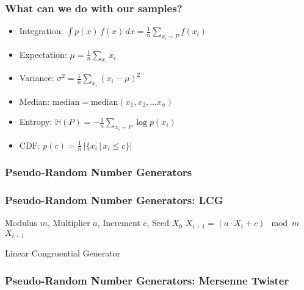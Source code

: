 \documentclass{beamer}
\begin{document}


\begin{frame}
\frametitle{What can we do with our samples?}
\begin{itemize}
  \item Integration: $\int p(x) \, f(x) \, dx = \frac{1}{n} \sum_{x_i \sim P} f(x_i) $
  \item Expectation: $ \mu = \frac{1}{n} \sum_{x_i} x_i $
  \item Variance: $ \sigma^2 = \frac{1}{n} \sum_{x_i} \left( x_i - \mu \right)^2$
  \item Median: $\text{median} = \text{median} (x_1, x_2, \hdots x_n)$
  \item Entropy: $\mathbb{H}(P) = - \frac{1}{n} \sum_{x_i \sim P} \log p (x_i)$
  \item CDF: $p(c) = \frac{1}{n} \, \vert \{ x_i \, | \, x_i \leq c \} \vert$
\end{itemize}
\end{frame}





\begin{frame}
\frametitle{Pseudo-Random Number Generators}
\end{frame}


\begin{frame}
\frametitle{Pseudo-Random Number Generators: LCG}
\begin{algorithm}[H]
\begin{algorithmic}[1]
  \REQUIRE Modulus $m$, Multiplier $a$, Increment $c$, Seed $X_0$
  \STATE $X_{i+1} = \left( a \cdot X_i + c \right) \mod m$
  \ENSURE $X_{i+1}$
\end{algorithmic}
\caption{Linear Congruential Generator}
\end{algorithm}
\end{frame}


\begin{frame}
\frametitle{Pseudo-Random Number Generators: Mersenne Twister}
\end{frame}


\end{document}
